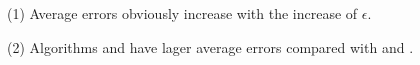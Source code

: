\ni(1) Average errors obviously increase with the increase of $\epsilon$.

\ni(2) Algorithms \cist and \cista have lager average errors compared with \dpa and \squishe.







